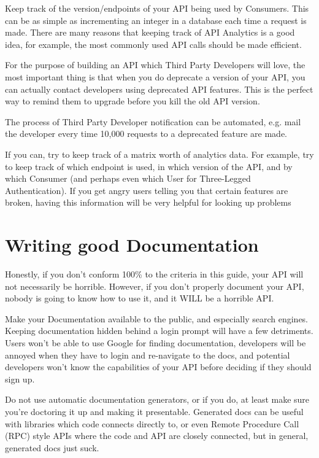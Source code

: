 \documentclass{book}
\begin{document}
Keep track of the version/endpoints of your API being used by Consumers. This can be as simple as incrementing an integer in a database each time a request is made. There are many reasons that keeping track of API Analytics is a good idea, for example, the most commonly used API calls should be made efficient.

For the purpose of building an API which Third Party Developers will love, the most important thing is that when you do deprecate a version of your API, you can actually contact developers using deprecated API features. This is the perfect way to remind them to upgrade before you kill the old API version.

The process of Third Party Developer notification can be automated, e.g. mail the developer every time 10,000 requests to a deprecated feature are made.

If you can, try to keep track of a matrix worth of analytics data. For example, try to keep track of which endpoint is used, in which version of the API, and by which Consumer (and perhaps even which User for Three-Legged Authentication). If you get angry users telling you that certain features are broken, having this information will be very helpful for looking up problems


\section{Writing good Documentation}

Honestly, if you don't conform 100\% to the criteria in this guide, your API will not necessarily be horrible. However, if you don't properly document your API, nobody is going to know how to use it, and it WILL be a horrible API.

Make your Documentation available to the public, and especially search engines. Keeping documentation hidden behind a login prompt will have a few detriments. Users won't be able to use Google for finding documentation, developers will be annoyed when they have to login and re-navigate to the docs, and potential developers won't know the capabilities of your API before deciding if they should sign up.

Do not use automatic documentation generators, or if you do, at least make sure you're doctoring it up and making it presentable. Generated docs can be useful with libraries which code connects directly to, or even Remote Procedure Call (RPC) style APIs where the code and API are closely connected, but in general, generated docs just suck.
\end{document}
